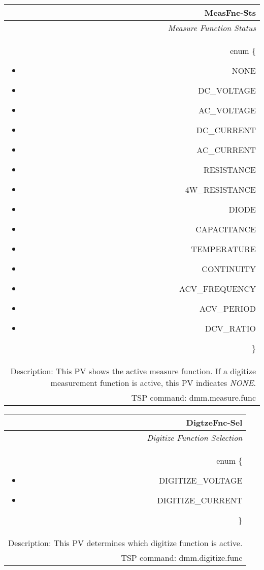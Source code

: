 \documentclass[openany]{article}
\begin{document}
		\begin{tabular}{N}
			\hline
			\bfseries MeasFnc-Sts\label{pv:measfnc-sts} \\ \hline
			\emph{Measure Function Status} \\
			enum \{\begin{itemize}[noitemsep]
				\small
				\item[] NONE
				\item[] DC\_VOLTAGE
				\item[] AC\_VOLTAGE
				\item[] DC\_CURRENT
				\item[] AC\_CURRENT
				\item[] RESISTANCE
				\item[] 4W\_RESISTANCE
				\item[] DIODE
				\item[] CAPACITANCE
				\item[] TEMPERATURE
				\item[] CONTINUITY
				\item[] ACV\_FREQUENCY
				\item[] ACV\_PERIOD
				\item[] DCV\_RATIO
			\end{itemize}\} \\
			Description: This PV shows the active measure function. If a digitize measurement function is active, this PV indicates \emph{NONE}. \\
			TSP command: dmm.measure.func
		\end{tabular}

		\begin{tabular}{N}
			\hline
			\bfseries DigtzeFnc-Sel\label{pv:digtzefnc-sel} \\ \hline
			\emph{Digitize Function Selection} \\
			enum \{\begin{itemize}[noitemsep]
				\small
				\item[] DIGITIZE\_VOLTAGE
				\item[] DIGITIZE\_CURRENT
			\end{itemize}\} \\
			Description: This PV determines which digitize function is active. \\
			TSP command: dmm.digitize.func
		\end{tabular}
\end{document}

